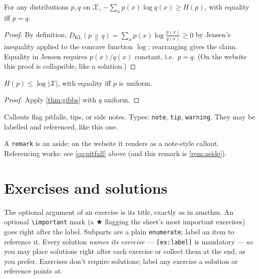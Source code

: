 \documentclass[11pt]{article}
\newcommand{\KL}[2]{D_{\mathrm{KL}}\!\left(#1 \,\middle\|\, #2\right)}
\begin{document}
\begin{theorem}
\label{thm:gibbs}
For any distributions $p, q$ on $\mathcal{X}$,
$-\sum_x p(x) \log q(x) \geq H(p)$, with equality iff $p = q$.
\end{theorem}

\begin{proof}
By definition, $\KL{p}{q} = \sum_x p(x) \log \frac{p(x)}{q(x)} \geq 0$ by
Jensen's inequality applied to the concave function $\log$; rearranging gives
the claim. Equality in Jensen requires $p(x)/q(x)$ constant, i.e.\ $p = q$.
(On the website this proof is collapsible, like a solution.)
\end{proof}

\begin{lemma}
\label{lem:uniform}
$H(p) \leq \log |\mathcal{X}|$, with equality iff $p$ is uniform.
\end{lemma}

\begin{proof}
Apply \cref{thm:gibbs} with $q$ uniform.
\end{proof}

\begin{callout}[warning]
\label{co:pitfall}
Callouts flag pitfalls, tips, or side notes. Types: \texttt{note},
\texttt{tip}, \texttt{warning}. They may be labelled and referenced,
like this one.
\end{callout}

\begin{remark}
\label{rem:aside}
A \texttt{remark} is an aside; on the website it renders as a note-style
callout. Referencing works: see \cref{co:pitfall} above (and this remark is
\cref{rem:aside}).
\end{remark}

\section{Exercises and solutions}
\label{sec:exercises}

The optional argument of an exercise is its title, exactly as in amsthm.
An optional \verb|\important| mark (a $\bigstar$ flagging the sheet's most
important exercises) goes right after the label. Subparts are a plain
\texttt{enumerate}; label an item to reference it. Every solution
\emph{names its exercise} — \texttt{[ex:label]} is mandatory — so you may
place solutions right after each exercise or collect them at the end, as you
prefer. Exercises don't require solutions; label any exercise a solution or
reference points at.
\end{document}
